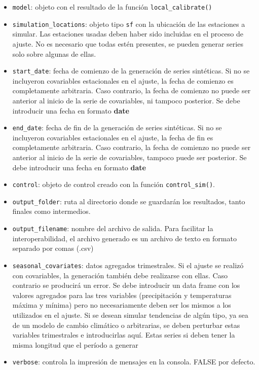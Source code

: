 \documentclass[
  12pt]{article}
\providecommand{\tightlist}{%
  \setlength{\itemsep}{0pt}\setlength{\parskip}{0pt}}
\begin{document}
\begin{itemize}
\tightlist
\item
  \texttt{model}: objeto con el resultado de la función \texttt{local\_calibrate()}
\item
  \texttt{simulation\_locations}: objeto tipo \texttt{sf} con la ubicación de las estaciones a simular. Las estaciones usadas deben haber sido incluidas en el proceso de ajuste. No es necesario que todas estén presentes, se pueden generar series solo sobre algunas de ellas.
\item
  \texttt{start\_date}: fecha de comienzo de la generación de series sintéticas. Si no se incluyeron covariables estacionales en el ajuste, la fecha de comienzo es completamente arbitraria. Caso contrario, la fecha de comienzo no puede ser anterior al inicio de la serie de covariables, ni tampoco posterior. Se debe introducir una fecha en formato \textbf{date}
\item
  \texttt{end\_date}: fecha de fin de la generación de series sintéticas. Si no se incluyeron covariables estacionales en el ajuste, la fecha de fin es completamente arbitraria. Caso contrario, la fecha de comienzo no puede ser anterior al inicio de la serie de covariables, tampoco puede ser posterior. Se debe introducir una fecha en formato \textbf{date}
\item
  \texttt{control}: objeto de control creado con la función \texttt{control\_sim()}.
\item
  \texttt{output\_folder}: ruta al directorio donde se guardarán los resultados, tanto finales como intermedios.
\item
  \texttt{output\_filename}: nombre del archivo de salida. Para facilitar la interoperabilidad, el archivo generado es un archivo de texto en formato separado por comas (.csv)
\item
  \texttt{seasonal\_covariates}: datos agregados trimestrales. Si el ajuste se realizó con covariables, la generación también debe realizarse con ellas. Caso contrario se producirá un error. Se debe introducir un data frame con los valores agregados para las tres variables (precipitación y temperaturas máxima y mínima) pero no necesariamente deben ser los mismos a los utilizados en el ajuste. Si se desean simular tendencias de algún tipo, ya sea de un modelo de cambio climático o arbitrarias, se deben perturbar estas variables trimestrales e introducirlas aquí. Estas series si deben tener la misma longitud que el período a generar
\item
  \texttt{verbose}: controla la impresión de mensajes en la consola. FALSE por defecto.
\end{itemize}
\end{document}
